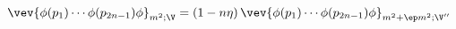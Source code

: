 \begin{equation}
\vev{ \phi (p_1) \cdots \phi (p_{2n-1}) \phi }_{m^2; \V}
= \left( 1 - n \eta \right) \vev{ \phi (p_1) \cdots \phi (p_{2n-1})
\phi }_{m^2 + \ep m^2; \V''} \label{generalequiv}
\end{equation}

